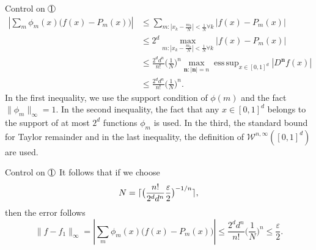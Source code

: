 \documentclass{if-beamer}
\DeclarePairedDelimiter{\ceil}{\lceil}{\rceil}
\newcommand*\circled[1]{\tikz[baseline=(char.base)]{
            \node[shape=circle,draw,inner sep=0.2pt] (char) {#1};}}
\DeclareMathOperator*{\esssup}{ess\,sup}
\begin{document}
\begin{frame}{Control on $\circled{1}$}
    \begin{align*}
        \left| \sum_{m}\phi_m(x) \big(f(x)-P_m(x)\big) \right|
        &\leq \sum_{m:|x_{k}-\frac{m_{k}}{N}|<\frac{1}{N}\forall k}
        \left| f(x)-P_m(x) \right|\\
        &\leq 2^{d}\max_{m:|x_{k}-\frac{m_{k}}{N}|<\frac{1}{N}\forall k}
        \left| f(x)-P_m(x) \right|\\
        &\leq \frac{2^{d} d^{n}}{n!}\bigg(\frac{1}{N}\bigg)^{n}
        \max_{\textbf{n}:|\textbf{n}|=n}\esssup_{x\in[0,1]^{d}}\left| D^{\textbf{n}}f(x) \right|\\
        &\leq \frac{2^{d} d^{n}}{n!}\bigg(\frac{1}{N}\bigg)^{n}.
    \end{align*}
    In the first inequality, we use the support condition of $\phi(m)$ and the fact $\|\phi_{m}\|_{\infty}=1$.
    In the second inequality, the fact that any $x\in[0,1]^{d}$ belongs to the support of at most $2^{d}$ functions $\phi_{m}$ is used. In the third, the standard bound for Taylor remainder and in the last inequality, the definition of $\mathcal{W}^{n,\infty}([0,1]^{d})$ are used.
\end{frame}

\begin{frame}{Control on $\circled{1}$}
    It follows that if we choose 
    \begin{equation*}
        N = \ceil{\big( \frac{n!}{2^{d}d^{n}} \frac{\varepsilon}{2} \big)^{-1/n}},
    \end{equation*}
    then the error follows 
    \begin{equation*}
        \| f - f_{1} \|_{\infty} 
        = \left| \sum_{m}\phi_m(x) \big(f(x)-P_m(x)\big) \right|
        \leq \frac{2^{d} d^{n}}{n!}\bigg(\frac{1}{N}\bigg)^{n}
        \leq \frac{\varepsilon}{2}.
    \end{equation*}
\end{frame}
\end{document}
